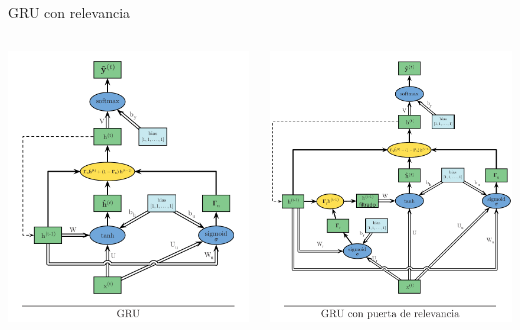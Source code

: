 \documentclass[aspectratio=169]{beamer}
\begin{document}
\begin{frame}{GRU con relevancia}
	\begin{columns}
		\begin{column}{0.5\textwidth}
			\includegraphics[width=.85\textwidth, center]{imgs/tema4/rnn/GRU.pdf}
		\end{column}

		\begin{column}{0.5\textwidth}
			\includegraphics[width=.85\textwidth, center]{imgs/tema4/rnn/GRUrele.pdf}
		\end{column}
	\end{columns}
\end{frame}
\end{document}
